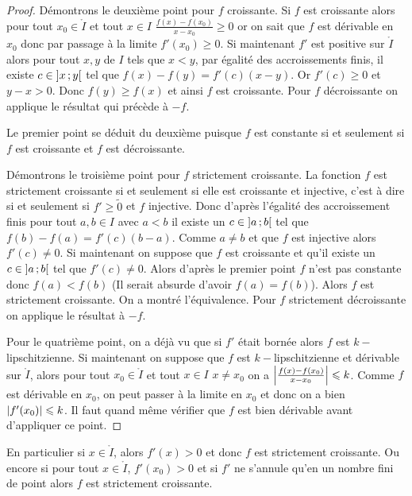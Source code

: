 \begin{proof}
  Démontrons le deuxième point pour \(f\) croissante. Si \(f\) est croissante
  alors pour tout \(x_0 \in \mathring{I}\) et tout \(x \in I\)
  \(\frac{f(x)-f(x_0)}{x-x_0} \geqslant 0\) or on sait que \(f\) est dérivable
  en \(x_0\) donc par passage à la limite \(f'(x_0) \geqslant 0\). Si maintenant
  \(f'\) est positive sur \(\mathring{I}\) alors pour tout \(x,y\) de \(I\) tels
  que \(x < y\), par égalité des accroissements finis, il existe \(c \in 
  \left] x \, ; {} y \right[\)
  tel que \(f(x)-f(y) = f'(c)(x-y)\). Or \(f'(c) \geqslant 0\) et \(y-x > 0\).
  Donc \(f(y) \geqslant f(x)\) et ainsi \(f\) est croissante. Pour \(f\)
  décroissante on applique le résultat qui précède à \(-f\).

  Le premier point se déduit du deuxième puisque \(f\) est constante si et
  seulement si \(f\) est croissante et \(f\) est décroissante.

  Démontrons le troisième point pour \(f\) strictement croissante. La fonction
  \(f\) est strictement croissante si et seulement si elle est croissante et
  injective, c'est à dire si et seulement si \(f' \geqslant \tilde{0}\) et \(f\)
  injective. Donc d'après l'égalité des accroissement finis pour tout \(a,b \in
  I\) avec \(a <b\) il existe un \(c \in \left] a \, ; {} b \right[\) tel que
  \(f(b)-f(a)=f'(c)(b-a)\). Comme \(a \neq b\) et que \(f\) est injective alors
  \(f'(c) \neq 0\). Si maintenant on suppose que \(f\) est croissante et qu'il
  existe un \(c \in \left] a \, ; {} b \right[\) tel que \(f'(c) \neq 0\). Alors
  d'après le premier point \(f\) n'est pas constante donc \(f(a) < f(b)\)
  (Il serait absurde d'avoir \(f(a)=f(b)\)). Alors \(f\) est strictement
  croissante. On a montré l'équivalence. Pour \(f\) strictement décroissante on
  applique le résultat à \(-f\).

  Pour le quatrième point, on a déjà vu que si \(f'\) était bornée alors \(f\)
  est \(k-\)lipschitzienne. Si maintenant on suppose que \(f\) est
  \(k-\)lipschitzienne et dérivable sur \(\mathring{I}\), alors pour tout \(x_0
  \in \mathring{I}\) et tout \(x \in I\) \(x \neq x_0\) on a
  \(\left\lvert\frac{f(x)-f(x_0)}{x-x_0}\right\rvert \leqslant k\). Comme \(f\) est dérivable en
  \(x_0\), on peut passer à la limite en \(x_0\) et donc on a bien
  \(\left\lvert f'(x_0)\right\rvert \leqslant k\). Il faut quand même vérifier que \(f\) est bien
  dérivable avant d'appliquer ce point.
\end{proof}

En particulier si \(x \in \mathring{I}\), alors \(f'(x)>0\) et donc \(f\) est
strictement croissante. Ou encore si pour tout \(x \in \mathring{I}\),
\(f'(x_0) >0\) et si \(f'\) ne s'annule qu'en un nombre fini de point alors
\(f\) est strictement croissante.

